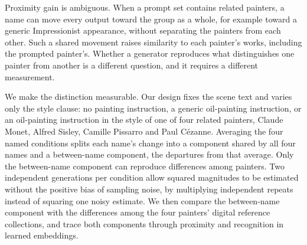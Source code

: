 \documentclass[10pt]{article}
\begin{document}
Proximity gain is ambiguous. When a prompt set contains related painters, a name
can move every output toward the group as a whole, for example toward a generic
Impressionist appearance, without separating the painters from each other. Such a
shared movement raises similarity to each painter's works, including the prompted
painter's. Whether a generator reproduces what distinguishes one painter from
another is a different question, and it requires a different measurement.

We make the distinction measurable. Our design fixes the scene text and varies
only the style clause: no painting instruction, a generic oil-painting
instruction, or an oil-painting instruction in the style of one of four related
painters, Claude Monet, Alfred Sisley, Camille Pissarro and Paul C\'ezanne.
Averaging the four named conditions splits each name's change into a component
shared by all four names and a between-name component, the departures from that
average. Only the between-name component can reproduce differences among painters.
Two independent generations per condition allow squared magnitudes to be
estimated without the positive bias of sampling noise, by multiplying independent
repeats instead of squaring one noisy estimate. We then compare the between-name
component with the differences among the four painters' digital reference
collections, and trace both components through proximity and recognition in
learned embeddings.
\end{document}
